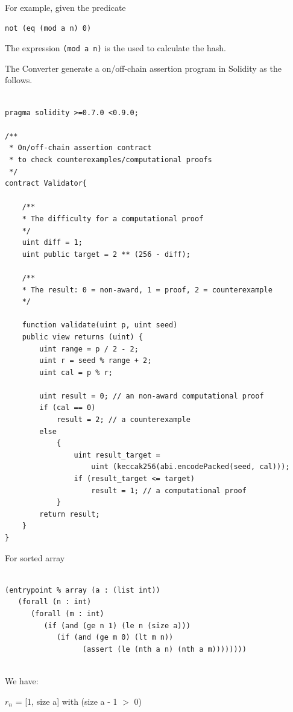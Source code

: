 \documentclass[runningheads]{llncs}
\begin{document}
For example, given the predicate 

\begin{lstlisting}[numbers=none]
not (eq (mod a n) 0)
\end{lstlisting}

\noindent The expression \texttt{(mod a n)} is the used to calculate the hash.

The Converter generate a on/off-chain assertion program in Solidity as the follows.

\begin{lstlisting}[numbers=none]

pragma solidity >=0.7.0 <0.9.0;

/**
 * On/off-chain assertion contract 
 * to check counterexamples/computational proofs
 */
contract Validator{

    /**
    * The difficulty for a computational proof
    */
    uint diff = 1;
    uint public target = 2 ** (256 - diff); 

    /**
    * The result: 0 = non-award, 1 = proof, 2 = counterexample
    */

    function validate(uint p, uint seed) 
    public view returns (uint) {
        uint range = p / 2 - 2; 
        uint r = seed % range + 2;
        uint cal = p % r;

        uint result = 0; // an non-award computational proof 
        if (cal == 0)  
            result = 2; // a counterexample
        else 
            {
                uint result_target = 
                    uint (keccak256(abi.encodePacked(seed, cal)));
                if (result_target <= target) 
                    result = 1; // a computational proof    
            }
        return result;           
    }
}

\end{lstlisting}

For sorted array

\begin{lstlisting}[numbers=none]

(entrypoint % array (a : (list int))
   (forall (n : int)
      (forall (m : int)
         (if (and (ge n 1) (le n (size a)))
            (if (and (ge m 0) (lt m n))
                  (assert (le (nth a n) (nth a m))))))))
                  
\end{lstlisting}

\noindent We have:

$r_{n}$ = [1, size a] with (size a - 1 $>$ 0)
\end{document}
